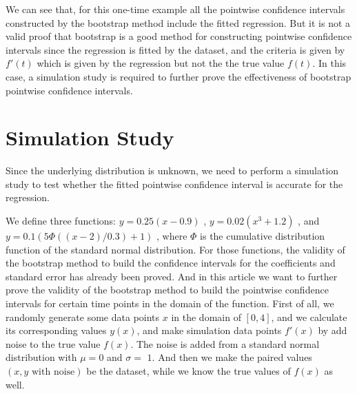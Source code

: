 \documentclass[12pt]{article}
\begin{document}
We can see that, for this one-time example all the pointwise confidence intervals constructed by the bootstrap method include the fitted regression. But it is not a valid proof that bootstrap is a good method for constructing pointwise confidence intervals since the regression is fitted by the dataset, and the criteria is given by \(f'(t)\) which is given by the regression but not the the true value \(f(t)\). In this case, a simulation study is required to further prove the effectiveness of bootstrap pointwise confidence intervals.









\section{Simulation Study}
\label{Simulation Study}


Since the underlying distribution is unknown, we need to perform a simulation study to test whether the fitted pointwise confidence interval is accurate for the regression.


We define three functions: \(y = 0.25(x - 0.9)\) , \(y = 0.02(x^3+1.2)\) , and \(y = 0.1(5\Phi((x - 2)/0.3) + 1)\) , where \(\Phi\) is the cumulative distribution function of the standard normal distribution. For those functions, the validity of the bootstrap method to build the confidence intervals for the coefficients and standard error has already been proved. \cite{jieying2022heteroscedastic} And in this article we want to further prove the validity of the bootstrap method to build the pointwise confidence intervals for certain time points in the domain of the function. First of all, we randomly generate some data points \(x\) in the domain of \([0,4]\), and we calculate its corresponding values \(y(x)\), and make simulation data points \(f'(x)\) by add noise to the true value \(f(x)\). The noise is added from a standard normal distribution with \(\mu = 0\) and \(\sigma = \) \(1\). And then we make the paired values \((x, y\text{ with noise})\) be the dataset, while we know the true values of \(f(x)\) as well. 
\end{document}

